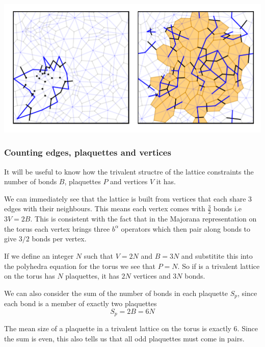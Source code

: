 \includegraphics[width=1\textwidth,height=\textheight]{figure_code/amk_chapter/flood_fill_amorphous/flood_fill_amorphous.pdf}

\hypertarget{counting-edges-plaquettes-and-vertices}{%
\subsubsection{Counting edges, plaquettes and
vertices}\label{counting-edges-plaquettes-and-vertices}}

It will be useful to know how the trivalent structre of the lattice
constraints the number of bonds \(B\), plaquettes \(P\) and vertices
\(V\) it has.

We can immediately see that the lattice is built from vertices that each
share 3 edges with their neighbours. This means each vertex comes with
\(\tfrac{3}{2}\) bonds i.e \(3V = 2B\). This is consistent with the fact
that in the Majorana representation on the torus each vertex brings
three \(b^\alpha\) operators which then pair along bonds to give \(3/2\)
bonds per vertex.

If we define an integer \(N\) such that \(V = 2N\) and \(B = 3N\) and
substitite this into the polyhedra equation for the torus we see that
\(P = N\). So if is a trivalent lattice on the torus has \(N\)
plaquettes, it has \(2N\) vertices and \(3N\) bonds.

We can also consider the sum of the number of bonds in each plaquette
\(S_p\), since each bond is a member of exactly two plaquettes
\[S_p = 2B = 6N\]

The mean size of a plaquette in a trivalent lattice on the torus is
exactly 6. Since the sum is even, this also tells us that all odd
plaquettes must come in pairs.

